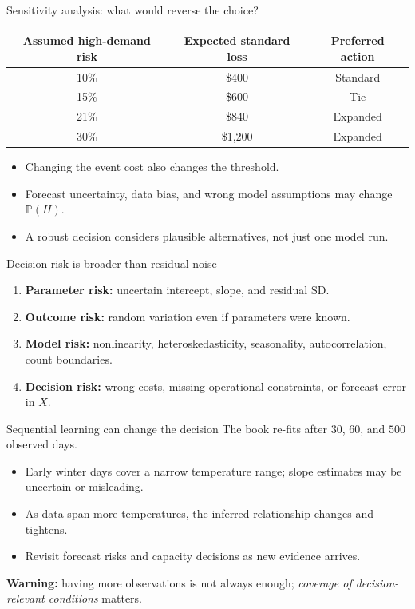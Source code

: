 \documentclass[aspectratio=43,11pt]{beamer}
\newcommand{\Prob}{\mathbb{P}}
\begin{document}
\begin{frame}{Sensitivity analysis: what would reverse the choice?}
\small
\begin{tabular}{c|c|c}
\toprule Assumed high-demand risk & Expected standard loss & Preferred action\\\midrule
10\% & \$400 & Standard\\
15\% & \$600 & Tie\\
21\% & \$840 & Expanded\\
30\% & \$1,200 & Expanded\\\bottomrule
\end{tabular}
\vspace{.4cm}
\begin{itemize}
\item Changing the event cost also changes the threshold.
\item Forecast uncertainty, data bias, and wrong model assumptions may change $\Prob(H)$.
\item A robust decision considers plausible alternatives, not just one model run.
\end{itemize}
\end{frame}

\begin{frame}{Decision risk is broader than residual noise}
\begin{enumerate}
\item \textbf{Parameter risk:} uncertain intercept, slope, and residual SD.
\item \textbf{Outcome risk:} random variation even if parameters were known.
\item \textbf{Model risk:} nonlinearity, heteroskedasticity, seasonality, autocorrelation, count boundaries.
\item \textbf{Decision risk:} wrong costs, missing operational constraints, or forecast error in $X$.
\end{enumerate}
\end{frame}

\begin{frame}{Sequential learning can change the decision}
The book re-fits after $30$, $60$, and $500$ observed days.
\begin{itemize}
\item Early winter days cover a narrow temperature range; slope estimates may be uncertain or misleading.
\item As data span more temperatures, the inferred relationship changes and tightens.
\item Revisit forecast risks and capacity decisions as new evidence arrives.
\end{itemize}
\par\medskip
\textbf{Warning:} having more observations is not always enough; \emph{coverage of decision-relevant conditions} matters.
\end{frame}
\end{document}
